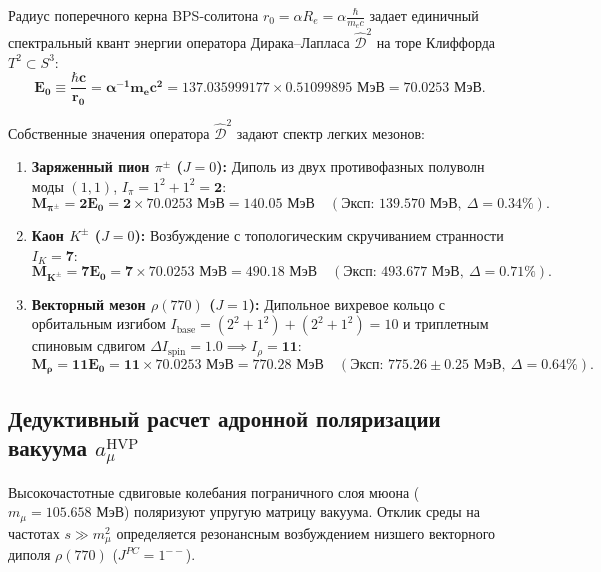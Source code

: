 \documentclass[11pt,a4paper]{article}
\theoremstyle{definition}
\theoremstyle{remark}
\begin{document}
Радиус поперечного керна BPS-солитона $r_0 = \alpha R_e = \alpha \frac{\hbar}{m_e c}$ задает единичный спектральный квант энергии оператора Дирака--Лапласа $\hat{\mathcal{D}}^2$ на торе Клиффорда $T^2 \subset S^3$:
\begin{equation}
    \mathbf{E_0 \equiv \frac{\hbar c}{r_0} = \alpha^{-1} m_e c^2 = 137.035999177 \times 0.51099895\text{ МэВ} = \mathbf{70.0253\text{ МэВ}}}.
    \label{eq:nambu_quantum_exact}
\end{equation}

Собственные значения оператора $\hat{\mathcal{D}}^2$ задают спектр легких мезонов:
\begin{enumerate}
    \item \textbf{Заряженный пион $\pi^\pm$ ($J=0$):} Диполь из двух противофазных полуволн моды $(1,1)$, $I_\pi = 1^2 + 1^2 = \mathbf{2}$:
    \begin{equation}
        \mathbf{M_{\pi^\pm} = 2 E_0 = 2 \times 70.0253\text{ МэВ} = \mathbf{140.05\text{ МэВ}}} \quad (\text{Эксп: } 139.570\text{ МэВ}, \ \Delta = 0.34\%).
    \end{equation}
    
    \item \textbf{Каон $K^\pm$ ($J=0$):} Возбуждение с топологическим скручиванием странности $I_K = \mathbf{7}$:
    \begin{equation}
        \mathbf{M_{K^\pm} = 7 E_0 = 7 \times 70.0253\text{ МэВ} = \mathbf{490.18\text{ МэВ}}} \quad (\text{Эксп: } 493.677\text{ МэВ}, \ \Delta = 0.71\%).
    \end{equation}
    
    \item \textbf{Векторный мезон $\rho(770)$ ($J=1$):} Дипольное вихревое кольцо с орбитальным изгибом $I_{\mathrm{base}} = (2^2+1^2) + (2^2+1^2) = 10$ и триплетным спиновым сдвигом $\Delta I_{\mathrm{spin}} = 1.0 \implies I_\rho = \mathbf{11}$:
    \begin{equation}
        \mathbf{M_\rho = 11 E_0 = 11 \times 70.0253\text{ МэВ} = \mathbf{770.28\text{ МэВ}}} \quad (\text{Эксп: } 775.26 \pm 0.25\text{ МэВ}, \ \Delta = 0.64\%).
    \end{equation}
\end{enumerate}

\subsection{Дедуктивный расчет адронной поляризации вакуума $a_\mu^{\mathrm{HVP}}$}
Высокочастотные сдвиговые колебания пограничного слоя мюона ($m_\mu = 105.658\text{ МэВ}$) поляризуют упругую матрицу вакуума. Отклик среды на частотах $s \gg m_\mu^2$ определяется резонансным возбуждением низшего векторного диполя $\rho(770)$ ($J^{PC} = 1^{--}$).
\end{document}
